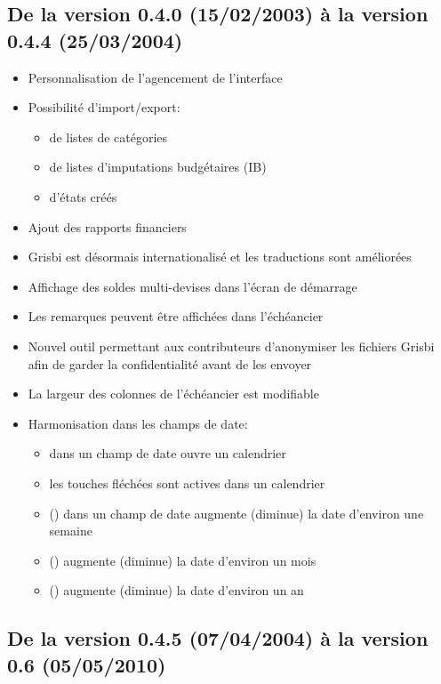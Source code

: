 
\subsection{De la version 0.4.0 \textnormal{(15/02/2003)} à la version 0.4.4 \textnormal{(25/03/2004)}}

\begin{itemize}
	\item Personnalisation de l'agencement de l'interface
	\item Possibilité d'import/export:
		\begin{itemize}
		\item de listes de catégories
		\item de listes d'imputations budgétaires (IB)
		\item d'états créés
		\end{itemize}	
	\item Ajout des rapports financiers
	\item Grisbi est désormais internationalisé et les traductions sont améliorées
	\item Affichage des soldes multi-devises dans l'écran de démarrage
	\item Les remarques peuvent être affichées dans l'échéancier
	\item Nouvel outil permettant aux contributeurs d'anonymiser les fichiers Grisbi afin de garder la confidentialité avant de les envoyer
	\item La largeur des colonnes de l'échéancier est modifiable
	\item Harmonisation dans les champs de date:
		\begin{itemize}
		\item {} dans un champ de date ouvre un calendrier
		\item les touches fléchées sont actives dans un calendrier
		\item {}\key{+} (\key{-}) dans un champ de date augmente (diminue) la date d'environ une semaine
		\item {} () augmente (diminue) la date d'environ un mois
		\item {} () augmente (diminue) la date d'environ un an
		\end{itemize}	
\end{itemize}

\subsection{De la version 0.4.5 \textnormal{(07/04/2004)} à la version 0.6 \textnormal{(05/05/2010)}}

